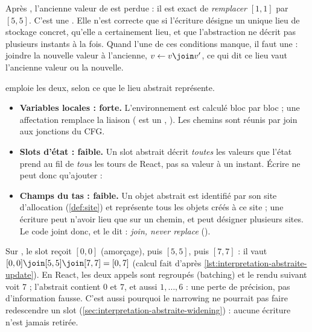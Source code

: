 Après , l'ancienne valeur de  est perdue : il est exact
de \emph{remplacer} $[1,1]$ par $[5,5]$. C'est une .
Elle n'est correcte que si l'écriture désigne un unique lieu de stockage
concret, qu'elle a certainement lieu, et que l'abstraction ne décrit pas
plusieurs instants à la fois. Quand l'une de ces conditions manque, il faut
une  : joindre la nouvelle valeur à l'ancienne,
$v \gets v \join v'$, ce qui dit \og ce lieu vaut l'ancienne valeur ou la
nouvelle\fg{}.

\reactant{} emploie les deux, selon ce que le lieu abstrait représente.
\begin{itemize}
  \item \textbf{Variables locales : forte.} L'environnement est calculé bloc
    par bloc ; une affectation remplace la liaison
    ( est un ,
    ). Les chemins sont
    réunis par join aux jonctions du CFG.
  \item \textbf{Slots d'état : faible.} Un slot abstrait décrit \emph{toutes}
    les valeurs que l'état prend au fil de \emph{tous} les tours de React,
    pas sa valeur à un instant. Écrire ne peut donc qu'ajouter :
\end{itemize}


\begin{itemize}
  \item \textbf{Champs du tas : faible.} Un objet abstrait est identifié par son
    site d'allocation (\cref{def:site}) et représente tous les objets créés à ce
    site ; une écriture  peut n'avoir lieu que sur un chemin, et
     peut désigner plusieurs sites. Le code joint donc, et le dit :
    \og \emph{join, never replace}\fg{}
    ().
\end{itemize}

Sur , le slot  reçoit $[0,0]$ (amorçage), puis
$[5,5]$, puis $[7,7]$ : il vaut $[0,0] \join [5,5] \join [7,7] = [0,7]$
(calcul fait d'après \cref{lst:interpretation-abstraite-update}). En React,
les deux appels sont regroupés (batching) et le rendu suivant voit 7 ;
l'abstrait contient $0$ et $7$, et aussi $1, \dots, 6$ : une perte de
précision, pas d'information fausse. C'est aussi pourquoi le narrowing ne
pourrait pas faire redescendre un slot
(\cref{sec:interpretation-abstraite-widening}) : aucune écriture n'est jamais
retirée.

